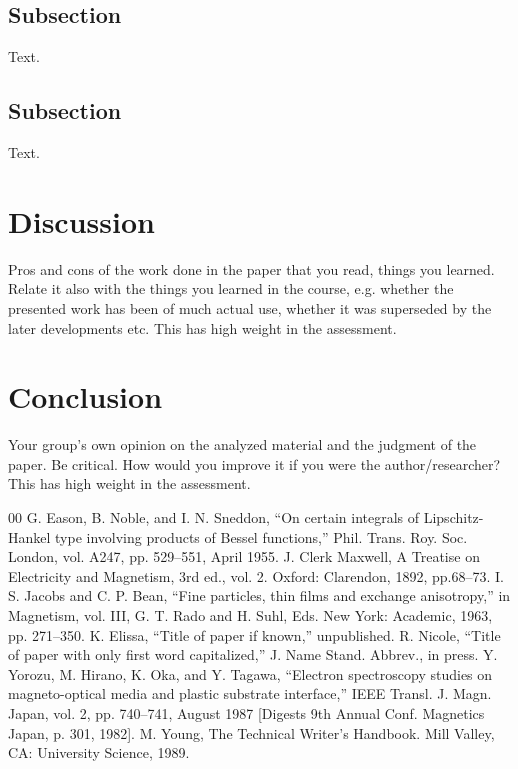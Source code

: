 \documentclass[conference]{IEEEtran}
\begin{document}
\subsection{Subsection}
Text.
\subsection{Subsection}
Text.
%
%
\section{Discussion}
Pros and cons of the work done in the paper that you read, things you learned. Relate it also with the things you learned in the course, e.g. whether the presented work has been of much actual use, whether it was superseded by the later developments etc. This has high weight in the assessment.
%
%
\section{Conclusion}
 Your group's own opinion on the analyzed material and the judgment of the paper. Be critical. How would you improve it if you were the author/researcher? This has high weight in the assessment.
%
%
\begin{thebibliography}{00}
 G. Eason, B. Noble, and I. N. Sneddon, ``On certain integrals of Lipschitz-Hankel type involving products of Bessel functions,'' Phil. Trans. Roy. Soc. London, vol. A247, pp. 529--551, April 1955.
 J. Clerk Maxwell, A Treatise on Electricity and Magnetism, 3rd ed., vol. 2. Oxford: Clarendon, 1892, pp.68--73.
 I. S. Jacobs and C. P. Bean, ``Fine particles, thin films and exchange anisotropy,'' in Magnetism, vol. III, G. T. Rado and H. Suhl, Eds. New York: Academic, 1963, pp. 271--350.
 K. Elissa, ``Title of paper if known,'' unpublished.
 R. Nicole, ``Title of paper with only first word capitalized,'' J. Name Stand. Abbrev., in press.
 Y. Yorozu, M. Hirano, K. Oka, and Y. Tagawa, ``Electron spectroscopy studies on magneto-optical media and plastic substrate interface,'' IEEE Transl. J. Magn. Japan, vol. 2, pp. 740--741, August 1987 [Digests 9th Annual Conf. Magnetics Japan, p. 301, 1982].
 M. Young, The Technical Writer's Handbook. Mill Valley, CA: University Science, 1989.
\end{thebibliography}
\vspace{12pt}
\end{document}

